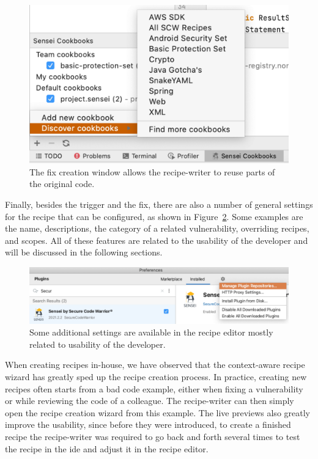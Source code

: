 \begin{figure}
  \centering
  \includegraphics[width=\textwidth,page=5]{04-tools/figures/figures1.pdf}
  \caption[Fix creation window]{The fix creation window allows the recipe-writer to reuse parts of the original code.}
  \label{fig:createfix} 
\end{figure}

Finally, besides the trigger and the fix, there are also a number of general settings for the recipe that can be configured, as shown in Figure~\ref{fig:generalsettings}.
Some examples are the name, descriptions, the category of a related vulnerability, overriding recipes, and scopes.
All of these features are related to the usability of the developer and will be discussed in the following sections.

\begin{figure}
  \centering
  \includegraphics[width=\textwidth,page=8]{04-tools/figures/figures2.pdf}
  \caption[General recipe settings]{Some additional settings are available in the recipe editor mostly related to usability of the developer.}
  \label{fig:generalsettings} 
\end{figure}

When creating recipes in-house, we have observed that the context-aware recipe wizard has greatly sped up the recipe creation process.
In practice, creating new recipes often starts from a bad code example, either when fixing a vulnerability or while reviewing the code of a colleague.
The recipe-writer can then simply open the recipe creation wizard from this example.
The live previews also greatly improve the usability, since before they were introduced, to create a finished recipe the recipe-writer was required to go back and forth several times to test the recipe in the \gls{ide} and adjust it in the recipe editor.


